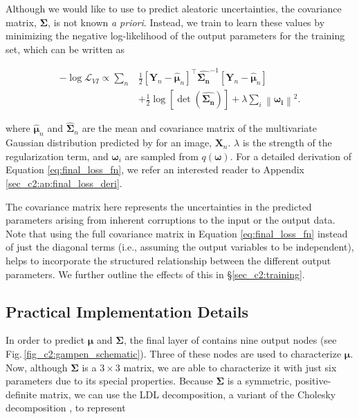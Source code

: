 Although we would like to use \gampen{} to predict aleatoric uncertainties, the covariance matrix, $\boldsymbol{\Sigma}$, is not known {\it a priori}. Instead, we train \gampen{} to learn these values by minimizing the negative log-likelihood of the output parameters for the training set, which can be written as

\begin{equation}
\begin{split}
- \log \mathcal{L}_{VI} \propto  \sum_{n} & \frac{1}{2}\left[\boldsymbol{Y}_{n}-\boldsymbol{\hat{\mu}}_{n}\right]^{\top} \boldsymbol{\hat{\Sigma_n}}^{-1}\left[\boldsymbol{Y}_{n}-\boldsymbol{\hat{\mu}}_{n}\right] \\ 
& + \frac{1}{2} \log [\operatorname{det}(\boldsymbol{\hat{\Sigma_n}})] + \lambda \sum_{i}\left\|\boldsymbol{\omega_{i}}\right\|^{2} .
\end{split}
\label{eq:final_loss_fn}
\end{equation}

where $\boldsymbol{\hat{\mu}}_n$ and $\boldsymbol{\hat{\Sigma}}_n$ are the mean and covariance matrix of the multivariate Gaussian distribution predicted by \gampen{} for an image, $\boldsymbol{X}_n$. $\lambda$ is the strength of the regularization term, and $\boldsymbol{\omega}_i$ are sampled from $q(\boldsymbol{\omega})$. For a detailed derivation of Equation \ref{eq:final_loss_fn}, we refer an interested reader to Appendix \ref{sec_c2:ap:final_loss_deri}.

The covariance matrix here represents the uncertainties in the predicted parameters arising from inherent corruptions to the input or the output data. Note that using the full covariance matrix in Equation \ref{eq:final_loss_fn} instead of just the diagonal terms (i.e., assuming the output variables to be independent), helps \gampen{} to incorporate the structured relationship between the different output parameters. We further outline the effects of this in \S \ref{sec_c2:training}.


\subsection{Practical Implementation Details} \label{subsec_c2:uncertainty_implementation}

In order to predict $\boldsymbol{\mu}$ and $\boldsymbol{\Sigma}$, the final layer of \gampen{} contains nine output nodes (see Fig.\,\ref{fig_c2:gampen_schematic}). Three of these nodes are used to characterize $\boldsymbol{\mu}$. %
Now, although $\boldsymbol{\Sigma}$ is a $3\times3$ matrix, we are able to characterize it with just six parameters due to its special properties. Because $\boldsymbol{\Sigma}$ is a symmetric, positive-definite matrix, we can use the LDL decomposition, a variant of the Cholesky decomposition \citep{cholesky}, to represent 

